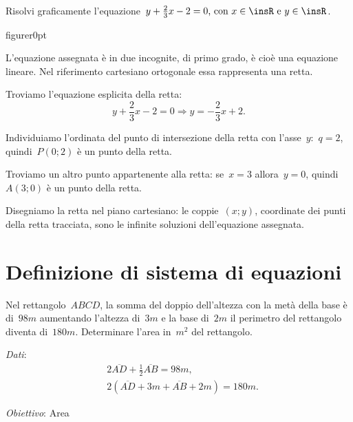 \begin{exrig}
\begin{esempio}
 Risolvi graficamente l'equazione~$y+\frac{2}{3}x-2=0\text{, con 
}x\in\insR\text{ e }y\in\insR$.
\end{esempio}

\begin{wrapfloat}{figure}{r}{0pt}

\end{wrapfloat}

L'equazione assegnata è in due incognite, di primo
grado, è cioè una equazione lineare. Nel riferimento cartesiano
ortogonale essa rappresenta una retta.

Troviamo l'equazione esplicita della retta:
\[y+\frac{2}{3}x-2=0\Rightarrow y=-{\frac{2}{3}}x+2.\]

Individuiamo l'ordinata del punto di intersezione della
retta con l'asse~$y$:~$q=2$, quindi~$P(0;2)$ è un
punto della retta.

Troviamo un altro punto appartenente alla retta: se~$x=3$ allora~$y=0$,
quindi~$A(3;0)$ è un punto della retta.

Disegniamo la retta nel piano cartesiano: le coppie~$(x;y)$, coordinate
dei punti della retta tracciata, sono le infinite soluzioni
dell'equazione assegnata.\vspace{1.10ex}
\end{exrig}


\section{Definizione di sistema di equazioni}
\label{sec:sist_definizione}

\begin{problema}
\label{pr:22.1}
Nel rettangolo~$ABCD$, la somma del doppio dell'altezza con la metà della base
è di~$98\unit{m}$ aumentando l'altezza di~$3\unit{m}$ e la base di~$2\unit{m}$ 
il perimetro del rettangolo diventa di~$180\unit{m}$. 
Determinare l'area in~$\unit{m}^{2}$ del rettangolo.
\end{problema}
\begin{multicols}{2}
\emph{Dati}:
\begin{align*}
&2\overline{AD}+\frac{1}{2}\overline{AB}=98\unit{m},\\
&2(\overline{AD}+3m+\overline{AB}+2m)=180\unit{m}.
\end{align*}

\emph{Obiettivo}: Area

\begin{center}
\begin{inaccessibleblock}
 
 \end{inaccessibleblock}
\end{center}
\end{multicols}

